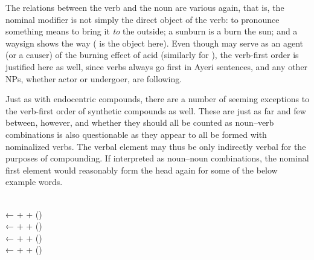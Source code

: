 The relations between the verb and the noun are various again, that is, the 
nominal modifier is not simply the direct object of the verb: to pronounce 
something means to bring it \emph{to} the outside; a sunburn is a burn 
 the sun; and a waysign shows the way ( is
the object here). Even though  may serve as an agent (or a
causer) of the burning effect of acid (similarly for
), the verb-first order is justified here as
well, since verbs always go first in Ayeri sentences, and any other NPs,
whether actor or undergoer, are following.%

Just as with endocentric compounds, there are a number of seeming exceptions to
the verb-first order of synthetic compounds as well. These are just as far and
few between, however, and whether they should all be counted as noun–verb
combinations is also questionable as they appear to all be formed with
nominalized verbs. The verbal element may thus be only indirectly verbal for
the purposes of compounding. If interpreted as noun--noun combinations, the
nominal first element would reasonably form the head again for some of the
below example words.

\pex\label{ex:compvbrev}
	\a {} \\
		← 
		+ 
		+  (\Dat{})
	\a {} \\
		← 
		+ 
		+  (\Nmlz{})
	\a {} \\
		← 
		+ 
		+  (\Nmlz{})
	\a {} \\
		← 
		+ 
		+  (\Nmlz{})
\xe


